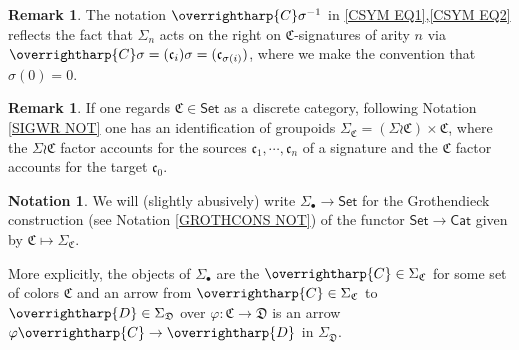 \documentclass[a4paper,10pt
,draft
]{article}%
\numberwithin{equation}{section}
\numberwithin{figure}{section}
\theoremstyle{definition} %
\newtheorem{remark}[equation]{Remark}%
\newtheorem{notation}[equation]{Notation}%
\newcommand{\vect}[1]{\text{\overrightharp{\ensuremath{#1}}}}
\newcommand{\1}{\ensuremath{\mathbbm 1}}%
\begin{document}
\begin{remark}\label{GLOBSIG REM}
The notation $\vect{C} \sigma^{-1}$
in \eqref{CSYM EQ1},\eqref{CSYM EQ2}
reflects the fact that $\Sigma_n$
acts on the right on $\mathfrak{C}$-signatures of arity $n$
via 
$\vect{C} \sigma = (\mathfrak{c}_i)\sigma = 
(\mathfrak{c}_{\sigma(i)})$,
where we make the convention that $\sigma(0)=0$.
\end{remark}



\begin{remark}
If one regards $\mathfrak{C} \in \mathsf{Set}$
as a discrete category, 
following Notation \ref{SIGWR NOT} one has an identification 
of groupoids
$\Sigma_{\mathfrak{C}} = (\Sigma \wr \mathfrak{C}) \times \mathfrak{C}$,
where the 
$\Sigma \wr \mathfrak{C}$ factor accounts for the sources
$\mathfrak{c}_1,\cdots,\mathfrak{c}_n$ of a signature
and the $\mathfrak{C}$ factor accounts for the target 
$\mathfrak{c}_0$.
\end{remark}



\begin{notation}
We will (slightly abusively) write
$\Sigma_{\bullet} \to \mathsf{Set}$
for the Grothendieck construction (see Notation \ref{GROTHCONS NOT})
of the functor
$\mathsf{Set} \to \mathsf{Cat}$ given by
$\mathfrak{C} \mapsto \Sigma_{\mathfrak{C}}$.

More explicitly, 
the objects of $\Sigma_{\bullet}$
are the $\vect{C} \in \Sigma_{\mathfrak{C}}$ 
for some set of colors $\mathfrak{C}$
and an arrow from
$\vect{C} \in \Sigma_{\mathfrak{C}}$ to
$\vect{D} \in \Sigma_{\mathfrak{D}}$
over $\varphi \colon \mathfrak{C} \to \mathfrak{D}$
is an arrow
$\varphi \vect{C} \to \vect{D}$ in $\Sigma_{\mathfrak{D}}$.
\end{notation}
\end{document}
